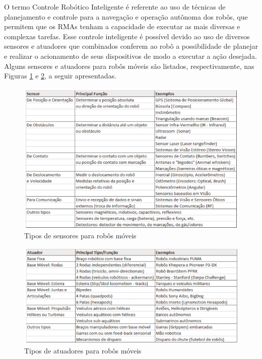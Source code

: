 O termo Controle Robótico Inteligente é referente ao uso de técnicas de planejamento e controle para a navegação e operação autônoma dos robôs, que permitem que os RMAs tenham a capacidade de executar as mais diversas e complexas tarefas. Esse controle inteligente é possível devido ao uso de diversos sensores e atuadores que combinados conferem ao robô a possibilidade de planejar e realizar o acionamento de seus dispositivos de modo a executar a ação desejada. Alguns sensores e atuadores para robôs móveis são listados, respectivamente, nas Figuras \ref{sensores} e \ref{atuadores}, a seguir apresentadas.

\FloatBarrier
\begin{figure}[!h]
\centering
\includegraphics[keepaspectratio=true,scale=0.7]{figuras/sensoresRobosMoveis.png}
\caption{Tipos de sensores para robôs móveis \cite{wolf2009robotica}}
\label{sensores}
\end{figure}

\FloatBarrier
\begin{figure}[!h]
\centering
\includegraphics[keepaspectratio=true,scale=0.7]{figuras/atuadoresRobosMoveis.png}
\caption{Tipos de atuadores para robôs móveis \cite{wolf2009robotica}}
\label{atuadores}
\end{figure}

